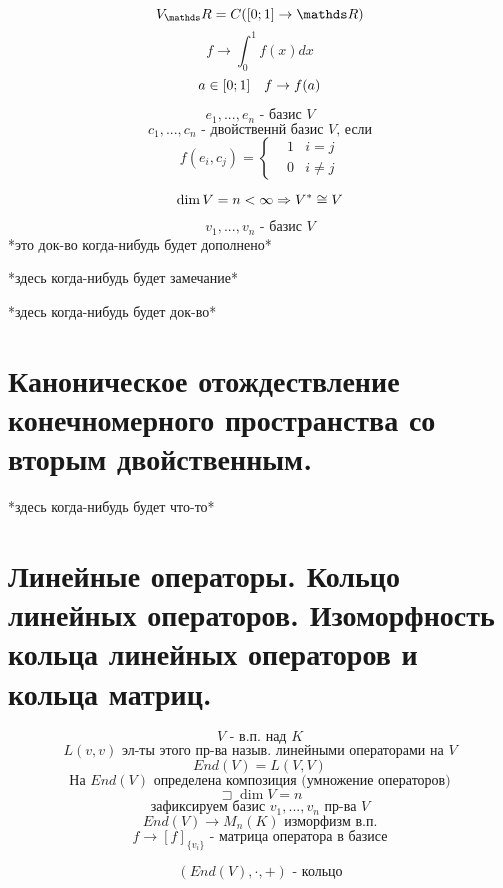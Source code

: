 \documentclass[12pt, fleqn]{article}
\begin{document}
\begin{Proof}
			\begin{Example}
					\[V_\R = C([0;1] \to \R)\]
					\[f \to  \int_{0}^1 f(x)dx\]
					\[a \in [0; 1] \quad f \to f(a)\]
			\end{Example}

			\begin{Definition}
				\[e_1, ..., e_n \text{ - базис }V\]
				\[c_1, ..., c_n \text{ - двойственнй базис } V \text{, если}\]
				\[f(e_i, c_j) = \left\{ \begin{align}
						&1 & i = j\\
						&0 & i \neq j
				\end{align}\]
			\end{Definition}

			\begin{Theorem}
					\[\dim V = n < \infty \Rightarrow V^* \cong V\]
			\end{Theorem}
			\begin{Proof}
					\[v_1, ..., v_n \text{ - базис } V\]
          *это док-во когда-нибудь будет дополнено*
			\end{Proof}

      \begin{remark}
        *здесь когда-нибудь будет замечание*
      \end{remark}

      \begin{example}
        *здесь когда-нибудь будет док-во*
      \end{example}

  \section{Каноническое отождествление конечномерного пространства со вторым двойственным.}

  *здесь когда-нибудь будет что-то*

	\section{Линейные операторы. Кольцо линейных операторов. Изоморфность кольца линейных операторов и кольца матриц.}
			\[V \text{ - в.п. над } K\]
			\[L(v, v) \text{ эл-ты этого пр-ва назыв. линейными операторами на }V\]
			\[End(V) = L(V, V)\]
			\[\text{На } End(V) \text{ определена композиция (умножение операторов)}\]
			\[\sqsupset \dim V = n\]
			\[\text{зафиксируем базис } v_1, ..., v_n \text{ пр-ва } V\]
			\[End(V) \to M_n (K) \text{ изморфизм в.п.}\]
			\[f \to [f]_{\{v_i\}} \text{ - матрица оператора в базисе} \]
			\begin{theorem}
				\[(End(V), \cdot, +) \text{ - кольцо}\]
			\end{theorem}


\end{Proof}
\end{document}
